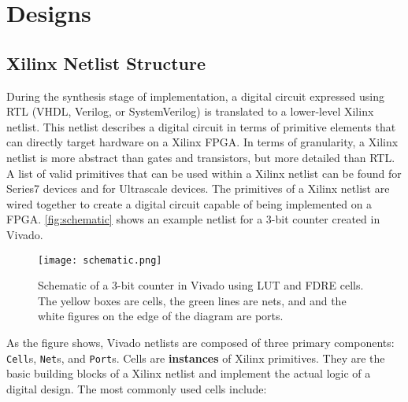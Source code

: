\newpage
\section{Designs}
\graphicspath{{./techReportFigures/sec5_designs/}}

\subsection{Xilinx Netlist Structure} \label{sec:xilinxNetlist}
During the synthesis stage of implementation, a digital circuit expressed using
RTL (VHDL, Verilog, or SystemVerilog) is translated to a lower-level Xilinx
netlist. This netlist describes a digital circuit in terms of primitive elements
that can directly target hardware on a Xilinx FPGA. In terms of granularity, a
Xilinx netlist is more abstract than gates and transistors, but more detailed
than RTL. A list of valid primitives that can be used within a Xilinx netlist
can be found
\href{http://www.xilinx.com/support/documentation/sw_manuals/xilinx2016_2/ug953-vivado-7series-libraries.pdf}{\color{blue}{here}}
for Series7 devices and
\href{http://www.xilinx.com/support/documentation/sw_manuals/xilinx2014_1/ug974-vivado-ultrascale-libraries.pdf}{\color{blue}{here}}
for Ultrascale devices. The primitives of a Xilinx netlist are wired together to
create a digital circuit capable of being implemented on a FPGA.
\autoref{fig:schematic} shows an example netlist for a 3-bit counter created in Vivado.

\begin{figure}[h!]
 \centering
 \texttt{[image: schematic.png]}
 \caption{Schematic of a 3-bit counter in Vivado using LUT and FDRE cells.
 The yellow boxes are cells, the green lines are nets, and and the
 white figures on the edge of the diagram are ports.}
 \label{fig:schematic}
\end{figure}

As the figure shows, Vivado netlists are composed of three primary components:
\texttt{Cell}s, \texttt{Net}s, and \texttt{Port}s. Cells are \textbf{instances} of
Xilinx primitives. They are the basic building blocks of a Xilinx netlist and
implement the actual logic of a digital design. The most commonly used
cells include:

